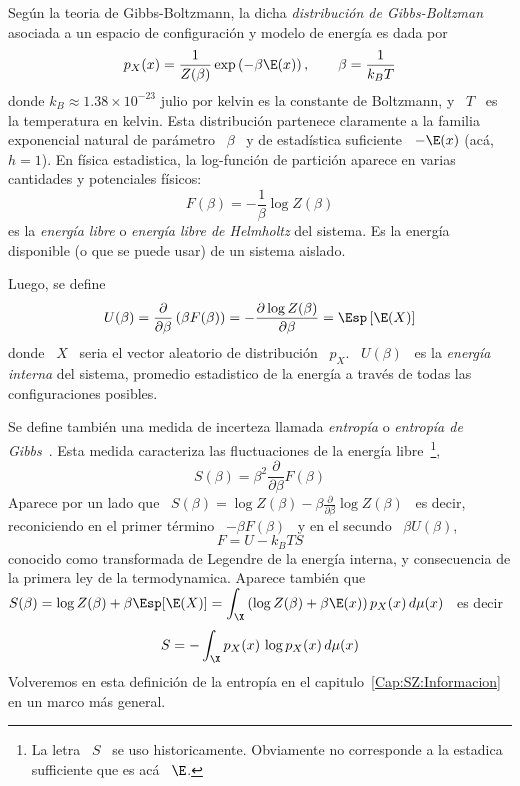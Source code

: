 \begin{ejemplo}
  Seg\'un  la  teoria  de  Gibbs-Boltzmann,  la  dicha  {\em  distribuci\'on  de
    Gibbs-Boltzman}  asociada  a  un  espacio  de configuraci\'on  y  modelo  de
  energ\'ia es dada por
  \[
  p_X(x) = \frac{1}{Z(\beta)}  \exp\left( - \beta \E(x) \right),  \qquad \beta =
  \frac{1}{k_B T}
  \]
  donde $k_B \approx  1.38 \times 10^{-23}$ julio por kelvin  es la constante de
  Boltzmann,  y  \ $T$  \  es la  temperatura  en  kelvin.  Esta  distribuci\'on
  partenece claramente a la familia exponencial natural de par\'ametro \ $\beta$
  \  y de  estad\'istica suficiente  \ $-\E(x)$  (ac\'a, $h  = 1$).  En f\'isica
  estadistica, la  log-funci\'on de partici\'on  aparece en varias  cantidades y
  potenciales f\'isicos:
  \[
  F(\beta) = - \frac{1}{\beta} \log Z(\beta)
  \]
  es  la  {\em  energ\'ia  libre}  o  {\em energ\'ia  libre  de  Helmholtz}  del
  sistema.  Es la  energ\'ia disponible  (o  que se  puede usar)  de un  sistema
  aislado.

  Luego, se define
  \[
  U(\beta) =  \frac{\partial}{\partial \beta} \left( \beta F(\beta)  \right) = -
  \frac{\partial \log Z(\beta)}{\partial \beta} = \Esp\left[ \E(X) \right]
  \]
  donde  \  $X$ \  seria  el  vector aleatorio  de  distribuci\'on  \ $p_X$.   \
  $U(\beta)$ \ es  la {\em energ\'ia interna} del  sistema, promedio estadistico
  de la energ\'ia a trav\'es de todas las configuraciones posibles.

  Se define  tambi\'en una medida de  incerteza llamada {\em  entrop\'ia} o {\em
    entrop\'ia  de  Gibbs}~\cite{Bol77, Bol96,  Bol98,  Gib02, Jay65,  LanLif80,
    MezMon09, Mer10,  Mer18}.  Esta medida  caracteriza las fluctuaciones  de la
  energ\'ia libre~\footnote{La  letra \ $S$ \ se  uso historicamente. Obviamente
    no corresponde a la estadica sufficiente que es ac\'a \ $\E$.},
  \[
  S(\beta) = \beta^2 \frac{\partial}{\partial \beta} F(\beta)
  \]
  Aparece   por   un  lado   que   \  $S(\beta)   =   \log   Z(\beta)  -   \beta
  \frac{\partial}{\partial \beta} \log Z(\beta)$  \ es decir, reconiciendo en el
  primer t\'ermino \ $- \beta F(\beta)$ \ y en el secundo \ $\beta U(\beta)$,
  \[
  F = U - k_B T S
  \]
  conocido como transformada de Legendre de la energ\'ia interna, y consecuencia
  de la  primera ley de  la termodynamica. Aparece tambi\'en  que $\displaystyle
  S(\beta) = \log Z(\beta) + \beta  \Esp[ \E(X) ] = \int_\X \left( \log Z(\beta)
    + \beta \E(x) \right) p_X(x) \, d\mu(x)$ \ es decir
  \[
  S = - \int_\X p_X(x) \, \log p_X(x) \, d\mu(x)
  \]
  Volveremos    en    esta    definici\'on    de    la    entrop\'ia    en    el
  capitulo~\ref{Cap:SZ:Informacion} en un marco m\'as general.
\end{ejemplo}


